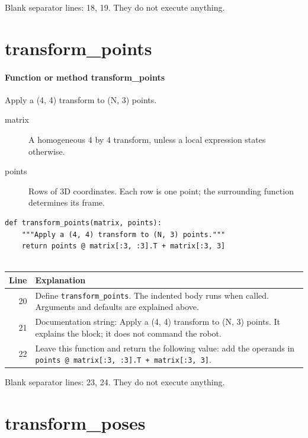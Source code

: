 \documentclass[11pt,a4paper]{book}
\begin{document}
Blank separator lines: 18, 19. They do not execute anything.

\section{transform\_points}

\paragraph{Function or method transform\_points}
Apply a (4, 4) transform to (N, 3) points.

\begin{description}
\item[matrix] A homogeneous 4 by 4 transform, unless a local expression states otherwise.
\item[points] Rows of 3D coordinates. Each row is one point; the surrounding function determines its frame.
\end{description}

\begin{lstlisting}[firstnumber=20]
def transform_points(matrix, points):
    """Apply a (4, 4) transform to (N, 3) points."""
    return points @ matrix[:3, :3].T + matrix[:3, 3]


\end{lstlisting}

\begin{longtable}{r p{}}

\textbf{Line} & \textbf{Explanation} \\ \hline \endhead

20 & Define \texttt{transform\_points}. The indented body runs when called. Arguments and defaults are explained above. \\

21 & Documentation string: Apply a (4, 4) transform to (N, 3) points. It explains the block; it does not command the robot. \\

22 & Leave this function and return the following value: add the operands in \texttt{points @ matrix[:3, :3].T + matrix[:3, 3]}. \\

\end{longtable}

Blank separator lines: 23, 24. They do not execute anything.

\section{transform\_poses}
\end{document}
